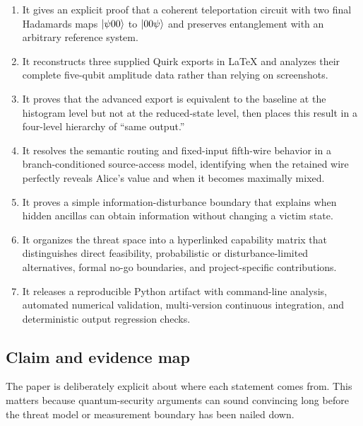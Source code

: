 \begin{enumerate}[leftmargin=1.8em]
  \item It gives an explicit proof that a coherent teleportation circuit with
  two final Hadamards maps $\ket{\psi00}$ to $\ket{00\psi}$ and preserves
  entanglement with an arbitrary reference system.
  \item It reconstructs three supplied Quirk exports in LaTeX and analyzes their
  complete five-qubit amplitude data rather than relying on screenshots.
  \item It proves that the advanced export is equivalent to the baseline at the
  histogram level but not at the reduced-state level, then places this result in
  a four-level hierarchy of ``same output.''
  \item It resolves the semantic routing and fixed-input fifth-wire behavior in
  a branch-conditioned source-access model, identifying when the retained wire
  perfectly reveals Alice's value and when it becomes maximally mixed.
  \item It proves a simple information-disturbance boundary that explains when
  hidden ancillas can obtain information without changing a victim state.
  \item It organizes the threat space into a hyperlinked capability matrix that
  distinguishes direct feasibility, probabilistic or disturbance-limited
  alternatives, formal no-go boundaries, and project-specific contributions.
  \item It releases a reproducible Python artifact with command-line analysis,
  automated numerical validation, multi-version continuous integration, and
  deterministic output regression checks.
\end{enumerate}

\subsection{Claim and evidence map}

The paper is deliberately explicit about where each statement comes from. This
matters because quantum-security arguments can sound convincing long before the
threat model or measurement boundary has been nailed down.

